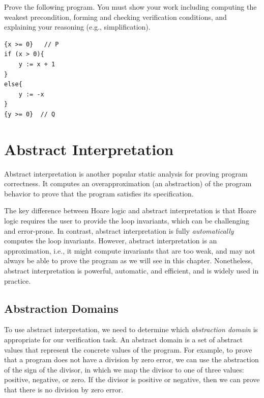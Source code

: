 \documentclass[oneside,11pt,dvipsnames]{book}
\begin{document}
Prove the following program. You must show your work including computing the weakest precondition, forming and checking verification conditions, and explaining your reasoning (e.g., simplification).

\begin{lstlisting}
{x >= 0}   // P 
if (x > 0){
    y := x + 1
}
else{
    y := -x
}
{y >= 0}  // Q
\end{lstlisting}


\chapter{Abstract Interpretation}

Abstract interpretation is another popular static analysis for proving program correctness.  It computes an overapproximation (an abstraction) of the program behavior to prove that the program satisfies its specification.


The key difference between Hoare logic and abstract interpretation is that Hoare logic requires the user to provide the loop invariants, which can be challenging and error-prone.  In contrast, abstract interpretation is fully \emph{automatically} computes the loop invariants.  However,  abstract interpretation is an approximation, i.e., it might compute invariants that are too weak, and may not always be able to prove the program as we will see in this chapter.  Nonetheless, abstract interpretation is powerful, automatic, and efficient, and is widely used in practice.


\section{Abstraction Domains}\label{sec:abstract-domains}

To use abstract interpretation, we need to determine which \emph{abstraction domain} is appropriate for our verification task. An abstract domain is a set of abstract values that represent the concrete values of the program.  For example, to prove that a program does not have a division by zero error, we can use the abstraction of the sign of the divisor, in which we map the divisor to one of three values: positive, negative, or zero.  If the divisor is positive or negative, then we can prove that there is no division by zero error. %
\end{document}
